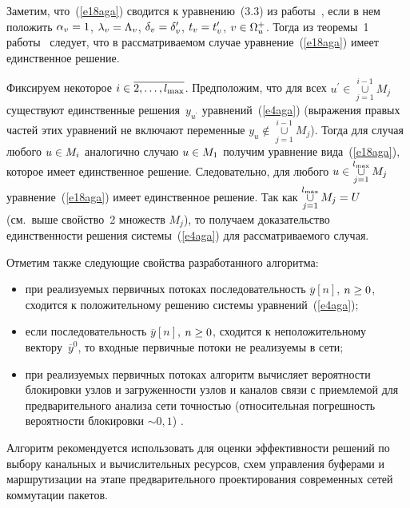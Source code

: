 \begin{multicols}{2}
     Заметим, что~(\ref{e18aga}) сводится к уравнению~(3.3) из 
работы~\cite{9aga}, если в нем положить $\alpha_v\hm=1$, 
$\lambda_v\hm=\Lambda_v$, $\delta_v\hm=\delta_v^\prime$, 
$t_v\hm=t_v^\prime$, $v\hm\in\Omega_u^+$. Тогда из теоремы~1 
работы~\cite{9aga} следует, что в рассматриваемом случае 
уравнение~(\ref{e18aga}) имеет единственное решение.
     
     Фиксируем некоторое $i\hm\in \overline{2,\ldots ,l_{\max}}$. 
Предположим, что для всех $u^\prime\in \mathop{\cup}\limits_{j=1}^{i-1} M_j$ 
существуют единственные решения~$y_{u^\prime}$ уравнений~(\ref{e4aga}) 
(выражения правых частей этих уравнений не включают переменные 
$y_u\not\in \mathop{\cup}\limits_{j=1}^{i-1} M_j$). Тогда для случая любого $u\hm\in M_i$ 
аналогично случаю $u\hm\in M_1$ получим уравнение вида~(\ref{e18aga}), 
которое имеет единственное решение. Следовательно, для любого $u\hm\in 
\mathop{\cup}\limits_{j=1}^{l_{\max}} M_j$ уравнение~(\ref{e18aga}) имеет 
единственное решение. Так как $\mathop{\cup}\limits_{j=1}^{l_{\max}} M_j\hm=U$ 
(см.\ выше свойство~2 множеств $M_j$), то получаем доказательство 
единственности решения системы~(\ref{e4aga}) для рассматриваемого 
случая. 
     
     Отметим также следующие свойства разработанного алгоритма: 
     \begin{itemize}
\item при реализуемых первичных потоках последовательность 
$\overline{y}[n]$, $n\hm\geq 0$, сходится к положительному решению 
системы уравнений~(\ref{e4aga});
\item если последовательность $\overline{y}[n]$, $n\hm\geq 0$, сходится к 
неположительному вектору~$\overline{y}^0$, то входные первичные 
потоки не реализуемы в сети;
\item при реализуемых первичных потоках алгоритм вычисляет 
вероятности блокировки узлов и загруженности узлов и каналов связи с 
приемлемой для предварительного анализа сети точ\-ностью 
(относительная погрешность вероятности блокировки $\sim 0{,}1$) .
   \end{itemize}
   
   Алгоритм рекомендуется использовать для оценки эффективности 
решений по выбору канальных и вычислительных ресурсов, схем управления 
буферами и маршрутизации на этапе предварительного проектирования 
современных сетей коммутации пакетов. 

{\small\frenchspacing
{%
\begin{thebibliography}{99}
     

\end{thebibliography}}}
\end{multicols}

